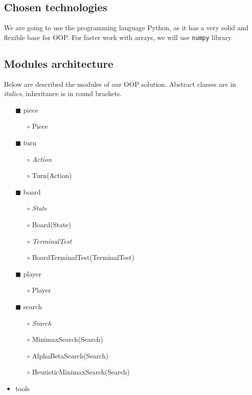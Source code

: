 \documentclass[paper=a4, fontsize=11pt]{article} %
\begin{document}
\subsection{Chosen technologies}
We are going to use the programming language Python, as it has a very solid and flexible base for OOP. For faster work with arrays, we will use \verb|numpy| library.

\subsection{Modules architecture}
Below are described the modules of our OOP solution. Abstract classes are in \textit{italics}, inheritance is in round brackets.
\begin{itemize}
	\item[$\blacksquare$] piece
	\begin{itemize}
		\item[$\circ$] Piece
	\end{itemize}

	\item[$\blacksquare$] turn
	\begin{itemize}
		\item[$\circ$] \textit{Action}
		\item[$\circ$] Turn(Action)
	\end{itemize}

	\item[$\blacksquare$] board
	\begin{itemize}
		\item[$\circ$] \textit{State}
		\item[$\circ$] Board(State)
		\item[$\circ$] \textit{TerminalTest}
		\item[$\circ$] BoardTerminalTest(TerminalTest)
	\end{itemize}

	\item[$\blacksquare$] player
	\begin{itemize}
		\item[$\circ$] Player
	\end{itemize}

	\item[$\blacksquare$] search
	\begin{itemize}
		\item[$\circ$] \textit{Search}
		\item[$\circ$] MinimaxSearch(Search)
		\item[$\circ$] AlphaBetaSearch(Search)
		\item[$\circ$] HeuristicMinimaxSearch(Search)
	\end{itemize}
	\item tools
\end{itemize}
\end{document}
